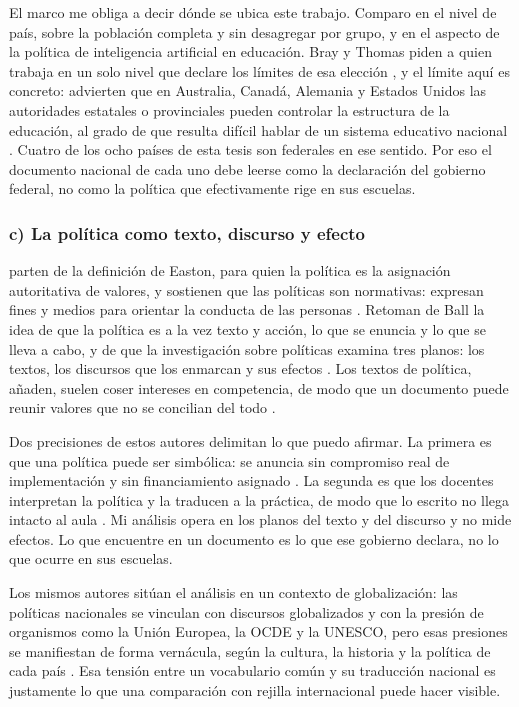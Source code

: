 El marco me obliga a decir dónde se ubica este trabajo. Comparo en el nivel de país, sobre
la población completa y sin desagregar por grupo, y en el aspecto de la política de
inteligencia artificial en educación. Bray y Thomas piden a quien trabaja en un solo nivel
que declare los límites de esa elección \citep[p.~488]{bray1995levels}, y el límite aquí es
concreto: advierten que en Australia, Canadá, Alemania y Estados Unidos las autoridades
estatales o provinciales pueden controlar la estructura de la educación, al grado de que
resulta difícil hablar de un sistema educativo nacional \citep[p.~479]{bray1995levels}.
Cuatro de los ocho países de esta tesis son federales en ese sentido. Por eso el documento
nacional de cada uno debe leerse como la declaración del gobierno federal, no como la
política que efectivamente rige en sus escuelas.

\subsubsection*{c) La política como texto, discurso y efecto}

\citet{rizvi2010globalizing} parten de la definición de Easton, para quien la política es
la asignación autoritativa de valores, y sostienen que las políticas
son normativas: expresan fines y medios para orientar la conducta de las personas
\citep[pp.~4, 7]{rizvi2010globalizing}. Retoman de Ball la idea de que la política es a la
vez texto y acción, lo que se enuncia y lo que se lleva a cabo, y de que la investigación
sobre políticas examina tres planos: los textos, los discursos que los enmarcan y sus
efectos \citep[pp.~4--5, 12]{rizvi2010globalizing}. Los textos de política, añaden, suelen
coser intereses en competencia, de modo que un documento puede reunir valores que no se
concilian del todo \citep[p.~6]{rizvi2010globalizing}.

Dos precisiones de estos autores delimitan lo que puedo afirmar. La primera es que una
política puede ser simbólica: se anuncia sin compromiso real de implementación y sin
financiamiento asignado \citep[p.~9]{rizvi2010globalizing}. La segunda es que los docentes
interpretan la política y la traducen a la práctica, de modo que lo escrito no llega
intacto al aula \citep[pp.~5--6]{rizvi2010globalizing}. Mi análisis opera en los planos del
texto y del discurso y no mide efectos. Lo que encuentre en un documento es lo que ese
gobierno declara, no lo que ocurre en sus escuelas.

Los mismos autores sitúan el análisis en un contexto de globalización: las políticas
nacionales se vinculan con discursos globalizados y con la presión de organismos como la
Unión Europea, la OCDE y la UNESCO, pero esas presiones se manifiestan de forma vernácula,
según la cultura, la historia y la política de cada país
\citep[pp.~x, xii]{rizvi2010globalizing}. Esa tensión entre un vocabulario común y su
traducción nacional es justamente lo que una comparación con rejilla internacional puede
hacer visible.

